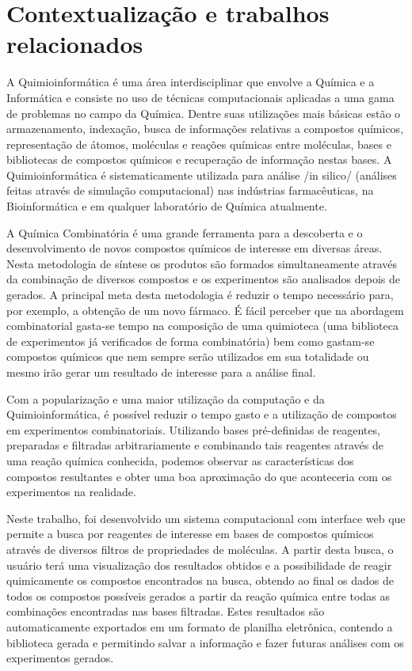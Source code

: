 \documentclass{abnt}
\begin{document}
\chapter{Contextualização e trabalhos relacionados}

A Quimioinformática é uma área interdisciplinar que envolve a Química e a Informática
e consiste no uso de técnicas computacionais aplicadas a uma gama de problemas no
campo da Química. Dentre suas utilizações mais básicas estão o armazenamento, indexação,
busca de informações relativas a compostos químicos, representação de átomos, moléculas
e reações químicas entre moléculas, bases e bibliotecas de compostos químicos e
recuperação de informação nestas bases. A Quimioinformática é sistematicamente utilizada
para análise /in silico/ (análises feitas através de simulação computacional) nas
indústrias farmacêuticas, na Bioinformática e em qualquer laboratório de Química
atualmente.

A Química Combinatória é uma grande ferramenta para a descoberta e o desenvolvimento
de novos compostos químicos de interesse em diversas áreas. Nesta metodologia de
síntese os produtos são formados simultaneamente através da combinação de diversos
compostos e os experimentos são analisados depois de gerados. A principal meta desta
metodologia é reduzir o tempo necessário para, por exemplo, a obtenção de um novo
fármaco. É fácil perceber que na abordagem combinatorial gasta-se tempo na composição
de uma quimioteca (uma biblioteca de experimentos já verificados de forma combinatória)
bem como gastam-se compostos químicos que nem sempre serão utilizados em sua totalidade
ou mesmo irão gerar um resultado de interesse para a análise final.

Com a popularização e uma maior utilização da computação e da Quimioinformática,
é possível reduzir o tempo gasto e a utilização de compostos em experimentos combinatoriais.
Utilizando bases pré-definidas de reagentes, preparadas e filtradas arbitrariamente
e combinando tais reagentes através de uma reação química conhecida, podemos observar
as características dos compostos resultantes e obter uma boa aproximação do que
aconteceria com os experimentos na realidade.

Neste trabalho, foi desenvolvido um sistema computacional com interface web que
permite a busca por reagentes de interesse em bases de compostos químicos através
de diversos filtros de propriedades de moléculas. A partir desta busca, o usuário
terá uma visualização dos resultados obtidos e a possibilidade de reagir quimicamente
os compostos encontrados na busca, obtendo ao final os dados de todos os compostos
possíveis gerados a partir da reação química entre todas as combinações encontradas
nas bases filtradas. Estes resultados são automaticamente exportados em um formato
de planilha eletrônica, contendo a biblioteca gerada e permitindo salvar a informação
e fazer futuras análises com os experimentos gerados.
\end{document}
